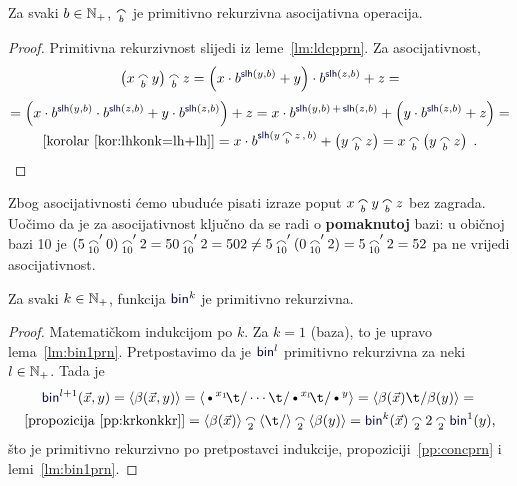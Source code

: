 \begin{propozicija}[{name=[primitivna rekurzivnost i asocijativnost konkatenacije]}]\label{pp:concprn}
Za svaki $b\in{\mathbb N}_+$, $\conc b$ je primitivno rekurzivna asocijativna operacija.
\end{propozicija}
\begin{proof}
Primitivna rekurzivnost slijedi iz leme~\ref{lm:ldcpprn}. Za asocijativnost,
\begin{multline}
    \left(x\conc b y\right)\conc b z=\left(x\cdot b^{\f{slh}(y,b)}+y\right)\cdot b^{\f{slh}(z,b)}+z=\\[1mm]
    =\left(x\cdot b^{\f{slh}(y,b)}\cdot b^{\f{slh}(z,b)}+y\cdot b^{\f{slh}(z,b)}\right)+z=
    x\cdot b^{\f{slh}(y,b)\,+\,\f{slh}(z,b)}+\left(y\cdot b^{\f{slh}(z,b)}+z\right)=\\[-1mm]
	\text{[korolar~\ref{kor:lhkonk=lh+lh}]}{}=x\cdot b^{\f{slh}(y\,\conc{{\scriptscriptstyle b}}\,z\,,\,b)}+\left(y\conc b z\right)=x\conc b\left(y\conc b z\right)\text{\qedhere\;.}
\end{multline}
\end{proof}
Zbog asocijativnosti ćemo ubuduće pisati izraze poput $x\conc by\conc bz$ bez zagrada. Uočimo da je za asocijativnost ključno da se radi o \textbf{pomaknutoj} bazi: u običnoj bazi 10 je $(5\conc{10}'0)\conc{10}'2=50\conc{10}'2=502\ne5\conc{10}'(0\conc{10}'2)=5\conc{10}'2=52$ pa ne vrijedi asocijativnost.

\begin{propozicija}[{name=[primitivna rekurzivnost višemjesnog binarnog kodiranja]}]\label{pp:binkprn}
Za svaki $k\in{\mathbb N}_+$, funkcija $\f{bin}^k$ je primitivno rekurzivna.
\end{propozicija}
\begin{proof}
Matematičkom indukcijom po $k$. Za $k=1$ (baza), to je upravo lema~\ref{lm:bin1prn}. Pretpostavimo da je $\f{bin}^l$ primitivno rekurzivna za neki $l\in{\mathbb N}_+$. Tada je
\begin{multline}
    \f{bin}^{l+1}(\vec x,y)=
    \kr{\beta(\vec x,y)}=
    \kr{\text\textbullet^{x_1}\!\t/\dotsm\t/\text\textbullet^{x_l}\!\t/\text\textbullet^y}=
    \kr{\beta(\vec x)\t/\beta(y)}={}\\
    \text{[propozicija~\ref{pp:krkonkkr}]}{}=\kr{\beta(\vec x)}\conc 2\kr{\t/}\conc 2\kr{\beta(y)}=
    \f{bin}^k(\vec x)\conc22\conc2\f{bin}^1(y)\text,
\end{multline}
što je primitivno rekurzivno po pretpostavci indukcije, propoziciji~\ref{pp:concprn} i lemi~\ref{lm:bin1prn}.
\end{proof}

